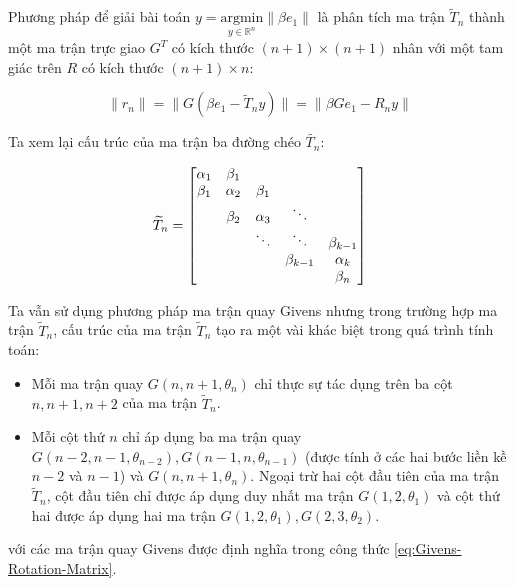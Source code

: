 \documentclass[14pt, a4paper]{article}
\numberwithin{equation}{section}
\numberwithin{algorithm}{section}
\numberwithin{figure}{section}
\numberwithin{dl}{section}
\numberwithin{md}{section}
\numberwithin{bd}{section}
\numberwithin{dn}{section}
\begin{document}
Phương pháp để giải bài toán $y=\underset{y \in \mathbb{R}^n}{\mathrm{argmin}} \lVert \beta e_1  \rVert$ là phân tích ma trận $\widetilde{T}_n$ thành một ma trận trực giao $G^T$ có kích thước $(n+1) \times (n+1)$ nhân với một tam giác trên $R$ có kích thước $(n+1) \times n$:

\begin{equation}
    \lVert r_n \rVert = \lVert G(\beta e_1 - \widetilde{T}_n y) \rVert = \lVert \beta G e_1 - R_n y \rVert
\end{equation}

Ta xem lại cấu trúc của ma trận ba đường chéo $\widetilde{T_n}$:

\begin{equation}
    \widetilde{T}_n = \begin{bmatrix}
        \alpha_1 & \beta_1 & \space & \space & \space \\
        \beta_1 & \alpha_2 & \beta_1 & \space & \space \\
        \space & \beta_2 & \alpha_3 & \ddots & \space \\
        \space & \space & \ddots & \ddots & \beta_{k-1} \\
        \space & \space & \space & \beta_{k-1} & \alpha_k \\
        \space & \space & \space & \space & \beta_{n}
    \end{bmatrix}
\end{equation}

Ta vẫn sử dụng phương pháp ma trận quay Givens nhưng trong trường hợp ma trận $\widetilde{T}_n$, cấu trúc của ma trận $\widetilde{T}_n$ tạo ra một vài khác biệt trong quá trình tính toán:

\begin{itemize}
    \item Mỗi ma trận quay $G(n, n+1, \theta_n)$ chỉ thực sự tác dụng trên ba cột $n, n+1, n+2$ của ma trận $\widetilde{T}_n$.
    \item Mỗi cột thứ $n$ chỉ áp dụng ba ma trận quay $G(n-2, n-1, \theta_{n-2}), G(n-1, n, \theta_{n-1})$ (được tính ở các hai bước liền kề $n-2$ và $n-1$) và $G(n, n+1, \theta_n)$. Ngoại trừ hai cột đầu tiên của ma trận $\widetilde{T}_n$, cột đầu tiên chỉ được áp dụng duy nhất ma trận $G(1, 2, \theta_1)$ và cột thứ hai được áp dụng hai ma trận $G(1, 2, \theta_1), G(2, 3,\theta_2)$.
\end{itemize}

với các ma trận quay Givens được định nghĩa trong công thức \ref{eq:Givens-Rotation-Matrix}.
\end{document}
